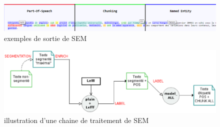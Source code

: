 \documentclass[citation\_needed]{subfiles}
\begin{document}
\begin{figure}[ht!]
\centering
\includegraphics[scale=0.5]{images/SEM/html-example}
\caption{exemples de sortie de SEM}
\label{fig:sem-html}
\end{figure}

\begin{figure}[ht!]
\centering
\includegraphics[scale=0.5]{images/SEM/pipeline-example}
\caption{illustration d'une chaine de traitement de SEM}
\label{fig:sem-pipeline-showcase}
\end{figure}
\end{document}
